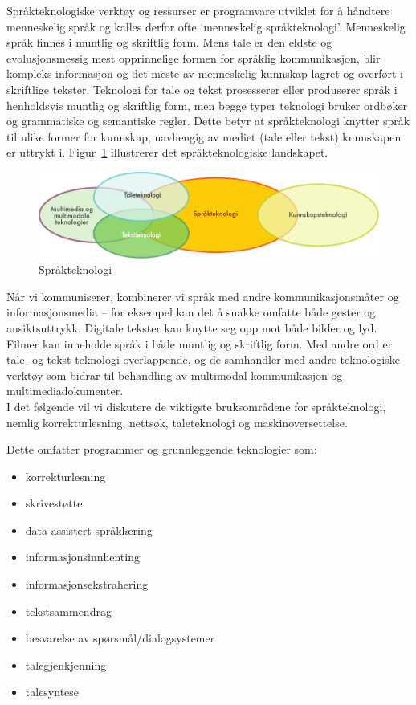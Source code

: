 \begin{multicols}{2}

Språkteknologiske verktøy og ressurser er programvare utviklet for å håndtere menneskelig språk og kalles derfor ofte `menneskelig språkteknologi'. 
Menneskelig språk finnes i muntlig og skriftlig form. Mens tale er den eldste og evolusjonsmessig mest opprinnelige formen for språklig kommunikasjon, blir kompleks informasjon og det meste av menneskelig kunnskap lagret og overført i skriftlige tekster. Teknologi for tale og tekst prosesserer eller produserer språk i henholdsvis muntlig og skriftlig form, men begge typer teknologi bruker ordbøker og grammatiske og semantiske regler. Dette betyr at språkteknologi knytter språk til ulike former for kunnskap, uavhengig av mediet (tale eller tekst) kunnskapen er uttrykt i. Figur~\ref{fig:ltincontext_no} illustrerer det språkteknologiske landskapet.

\begin{figure}[htb]
  \center
  \includegraphics[width=\textwidth]{../_media/norwegian-bokmaal/language_technologies}
  \caption{Språkteknologi}
  \label{fig:ltincontext_no}
\end{figure}

Når vi kommuniserer, kombinerer vi språk med andre kommunikasjonsmåter og informasjonsmedia -- for eksempel kan det å snakke omfatte både gester og ansiktsuttrykk. Digitale tekster kan knytte seg opp mot både bilder og lyd. Filmer kan inneholde språk i både muntlig og skriftlig form. Med andre ord er tale- og tekst-teknologi overlappende, og de samhandler med andre teknologiske verktøy som bidrar til behandling av multimodal kommunikasjon og multimediadokumenter.\\ 
I det følgende vil vi diskutere de viktigste bruksområdene for språkteknologi, nemlig korrekturlesning, nettsøk, taleteknologi og maskinoversettelse. 

Dette omfatter programmer og grunnleggende teknologier som:

\begin{itemize}
\item korrekturlesning
\item skrivestøtte
\item data-assistert språklæring
\item informasjonsinnhenting  
\item informasjonsekstrahering
\item tekstsammendrag
\item besvarelse av spørsmål/dialogsystemer
\item talegjenkjenning 
\item talesyntese 
\end{itemize}


\end{multicols}

